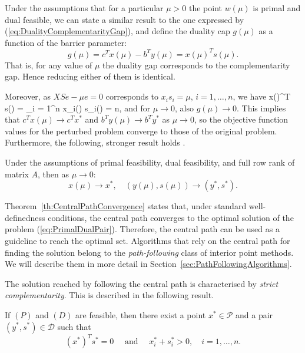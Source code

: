 
Under the assumptions that for a particular $\mu > 0$ the point
$w(\mu)$ is primal and dual feasible, we can state
a similar result to the one expressed by 
(\ref{eq:DualityComplementarityGap}), and define the duality cap
$g(\mu)$ as a function of the barrier parameter:
\[
  g(\mu) = c^Tx(\mu) - b^T y(\mu) = x(\mu)^T s(\mu).
\]
That is, for any value of $\mu$
the duality gap corresponds to the complementarity gap.
Hence reducing either of them is identical.

Moreover, as $XSe - \mu e = 0$ corresponds to $x_is_i = \mu$, $i=1,\ldots,n$,
we have
\be  \label{eq:AverageComplementarity}
   x(\mu)^T s(\mu) = \sum_{i = 1}^n x_i(\mu) s_i(\mu) = n\mu,
\ee
and for $\mu \to 0$, also $g(\mu) \to 0$.
This implies that $c^Tx(\mu)\to c^Tx^*$ and $b^Ty(\mu) \to b^Ty^*$ 
as $\mu\to 0$, so the objective function values for the perturbed
problem converge to those of the original problem.
Furthermore, the following, stronger result holds \cite{Megiddo}.
%
\begin{theorem}
\label{th:CentralPathConvergence}
Under the assumptions of primal feasibility, dual feasibility, and
full row rank of matrix $A$, then as $\mu \to 0:$
\[
   x(\mu) \to x^*, \quad (y(\mu),s(\mu)) \to (y^*, s^*).
\]
\end{theorem}

Theorem~\ref{th:CentralPathConvergence} states that, under standard
well-definedness conditions, the central path converges to 
the optimal solution of the problem (\ref{eq:PrimalDualPair}).
Therefore, the central path can be used as a guideline to
reach the optimal set.
Algorithms that rely on the central path for finding the solution
belong to the {\em path-following} class of interior point methods.
We will describe them in more detail
in Section~\ref{sec:PathFollowingAlgorithms}.

The solution reached by following the central path is 
characterised by {\em strict complementarity}. 
This is described in the following result.

\begin{theorem}
If $(P)$ and $(D)$ are feasible, then there exist a point $x^* \in\mathcal{P}$
and a pair $(y^*,s^*) \in \mathcal{D}$ such that
\[
(x^*)^T s^* = 0 \quad\mbox{ and }\quad x^*_i + s_i^* >0, \quad i = 1,\ldots,n.
\]
\end{theorem}

